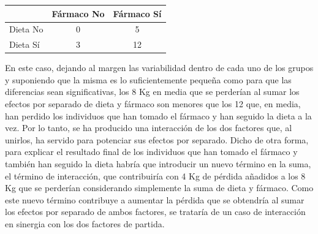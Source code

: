 \documentclass[
  a4paper,
]{scrreport}
\theoremstyle{plain}
\theoremstyle{definition}
\theoremstyle{definition}
\theoremstyle{remark}
\begin{document}
\begin{longtable}[]{@{}lcc@{}}
\toprule\noalign{}
& Fármaco No & Fármaco Sí \\
\midrule\noalign{}
\endhead
\bottomrule\noalign{}
\endlastfoot
Dieta No & 0 & 5 \\
Dieta Sí & 3 & 12 \\
\end{longtable}

En este caso, dejando al margen las variabilidad dentro de cada uno de
los grupos y suponiendo que la misma es lo suficientemente pequeña como
para que las diferencias sean significativas, los 8 Kg en media que se
perderían al sumar los efectos por separado de dieta y fármaco son
menores que los 12 que, en media, han perdido los individuos que han
tomado el fármaco y han seguido la dieta a la vez. Por lo tanto, se ha
producido una interacción de los dos factores que, al unirlos, ha
servido para potenciar sus efectos por separado. Dicho de otra forma,
para explicar el resultado final de los individuos que han tomado el
fármaco y también han seguido la dieta habría que introducir un nuevo
término en la suma, el término de interacción, que contribuiría con 4 Kg
de pérdida añadidos a los 8 Kg que se perderían considerando simplemente
la suma de dieta y fármaco. Como este nuevo término contribuye a
aumentar la pérdida que se obtendría al sumar los efectos por separado
de ambos factores, se trataría de un caso de interacción en sinergia con
los dos factores de partida.
\end{document}
